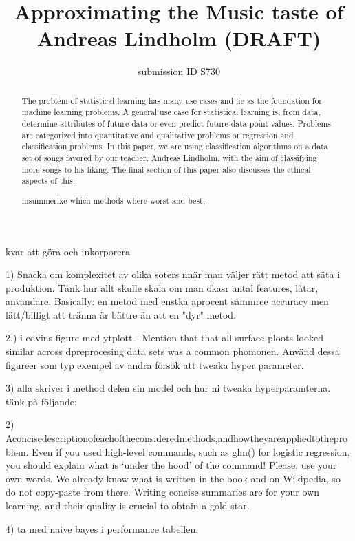 \documentclass{article}
\title{Approximating the Music taste of Andreas Lindholm (DRAFT)}
\author{
submission ID S730
}
\begin{document}
    \maketitle
    kvar att göra och inkorporera

1) Snacka om komplexitet av olika soters nnär man väljer rätt metod att säta i produktion.  Tänk hur allt skulle skala om man ökasr antal features, låtar, användare. Basically: en metod med enstka aprocent sämmree accuracy men lätt/billigt att tränna är bättre än att en "dyr" metod. 

2.) i edvins figure med ytplott - Mention that that all surface ploots looked similar across dpreprocesing data sets was a common phomonen. Använd dessa figureer som typ exempel av andra försök att tweaka hyper parameter.


3) alla skriver i method delen sin model och hur ni tweaka hyperparamterna. tänk på följande: 

2) Aconcisedescriptionofeachoftheconsideredmethods,andhowtheyareappliedtotheproblem. Even if you used high-level commands, such as glm() for logistic regression, you should explain what is ‘under the hood’ of the command! Please, use your own words. We already know what is written in the book and on Wikipedia, so do not copy-paste from there. Writing concise summaries are for your own learning, and their quality is crucial to obtain a gold star.

4) ta med naive bayes i performance tabellen. 

    \begin{abstract}
    The problem of statistical learning has many use cases and lie as the foundation for machine learning problems. A general use case for statistical learning is, from data, determine attributes of future data or even predict future data point values. Problems are categorized into quantitative and qualitative problems or regression and classification problems. 
    In this paper, we are using classification algorithms on a data set of songs favored by our teacher, Andreas Lindholm, with the aim of classifying more songs to his liking. The final section of this paper also discusses the ethical aspects of this.
    
    
    msummerixe which methods where worst and best,  
    \end{abstract}
    
\end{document}
